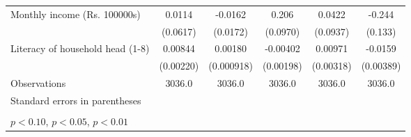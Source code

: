 \begin{table}[htbp]
\begin{tabular*}{1.0\hsize}{@{\hskip\tabcolsep\extracolsep\fill}l*{5}{c}}
\addlinespace
Monthly income (Rs. 100000s)    &      0.0114         &     -0.0162         &       0.206\sym{**} &      0.0422         &      -0.244\sym{*}  \\
                                &    (0.0617)         &    (0.0172)         &    (0.0970)         &    (0.0937)         &     (0.133)         \\
\addlinespace
Literacy of household head (1-8)&     0.00844\sym{***}&     0.00180\sym{**} &    -0.00402\sym{**} &     0.00971\sym{***}&     -0.0159\sym{***}\\
                                &   (0.00220)         &  (0.000918)         &   (0.00198)         &   (0.00318)         &   (0.00389)         \\
\midrule
Observations                    &      3036.0         &      3036.0         &      3036.0         &      3036.0         &      3036.0         \\
\bottomrule
\multicolumn{6}{l}{\footnotesize Standard errors in parentheses}\\
\multicolumn{6}{l}{\footnotesize }\\
\multicolumn{6}{l}{\footnotesize \sym{*} \(p<0.10\), \sym{**} \(p<0.05\), \sym{***} \(p<0.01\)}\\
\end{tabular*}
\end{table}

